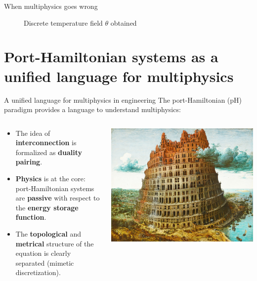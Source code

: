 \documentclass[aspectratio=169]{beamer}
\begin{document}
\begin{frame}{When multiphysics goes wrong}
\begin{figure}[t]
\begin{subfigure}[t]{0.32\textwidth}
	\end{subfigure}
\caption{Discrete temperature field $\theta$ obtained }
\end{figure}

\end{frame}

\section{Port-Hamiltonian systems as a unified language for multiphysics}

\begin{frame}{A unified language for multiphysics in engineering}
	The port-Hamiltonian (pH) paradigm provides a language to understand multiphysics:
	\vspace{.5cm}
	\begin{columns}
		\begin{column}{.6\textwidth}
			\begin{itemize}
				\item The idea of \textbf{interconnection} is formalized as \textbf{duality pairing}.
				\item \textbf{Physics} is at the core: port-Hamiltonian systems are \textbf{passive} with respect to the \textbf{energy storage function}.
				\item The \textbf{topological} and \textbf{metrical} structure of the equation is clearly separated (mimetic discretization).
			\end{itemize}
		\end{column}
		\begin{column}{.4\textwidth}
			\centering
			\includegraphics[width=.9\columnwidth]{babel_tower.jpeg}
		\end{column}
	\end{columns}

\end{frame}
\end{document}
